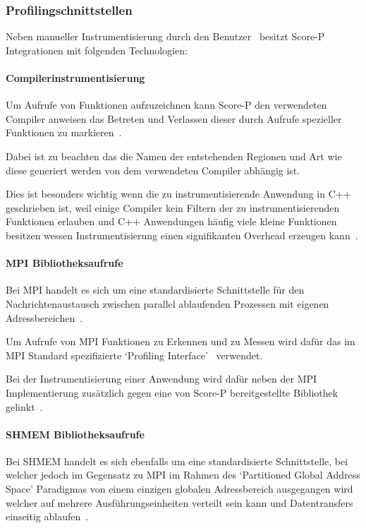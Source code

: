 \documentclass[german,proseminar,hyperref,utf8]{zihpub}
\begin{document}
    \subsubsection{Profilingschnittstellen}
    Neben manueller Instrumentisierung durch den Benutzer~
    besitzt Score-P Integrationen mit folgenden Technologien:

    \paragraph{Compilerinstrumentisierung}
    Um Aufrufe von Funktionen aufzuzeichnen kann Score-P den verwendeten Compiler
    anweisen das Betreten und Verlassen dieser durch Aufrufe spezieller Funktionen
    zu markieren~.

    Dabei ist zu beachten das die Namen der entstehenden Regionen und Art wie diese generiert
    werden von dem verwendeten Compiler abhängig ist.

    Dies ist besonders wichtig wenn die zu instrumentisierende Anwendung in C++ geschrieben ist,
    weil einige Compiler kein Filtern der zu instrumentisierenden Funktionen erlauben und C++
    Anwendungen häufig viele kleine Funktionen besitzen wessen Instrumentisierung einen signifikanten
    Overhead erzeugen kann~.

    \paragraph{MPI Bibliotheksaufrufe}
    Bei MPI handelt es sich um eine standardisierte Schnittstelle für den Nachrichtenaustausch
    zwischen parallel ablaufenden Prozessen mit eigenen Adressbereichen~.

    Um Aufrufe von MPI Funktionen zu Erkennen und zu Messen wird dafür das im MPI Standard
    spezifizierte `Profiling Interface'~ verwendet.

    Bei der Instrumentisierung einer Anwendung wird dafür neben der MPI Implementierung zusätzlich
    gegen eine von Score-P bereitgestellte Bibliothek gelinkt~.

    \paragraph{SHMEM Bibliotheksaufrufe}
    Bei SHMEM handelt es sich ebenfalls um eine standardisierte Schnittstelle, bei welcher jedoch
    im Gegensatz zu MPI im Rahmen des `Partitioned Global Address Space' Paradigmas von einem
    einzigen globalen Adressbereich ausgegangen wird welcher auf mehrere Ausführungseinheiten
    verteilt sein kann und Datentransfers einseitig ablaufen~.
\end{document}
